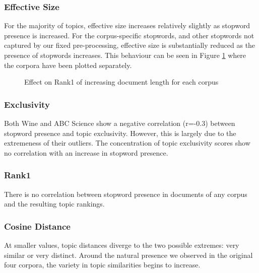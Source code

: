 \documentclass[letterpaper, 10 pt, conference]{ieeeconf}  %
\begin{document}
\subsubsection{Effective Size}
For the majority of topics, effective size increases relatively slightly as stopword presence is increased. For the corpus-specific stopwords, and other stopwords not captured by our fixed pre-processing, effective size is substantially reduced as the presence of stopwords increases. This behaviour can be seen in Figure \ref{fig:sw_eff_size_4_6} where the corpora have been plotted separately.
\begin{figure}[thpb]
      \centering
      \caption{Effect on Rank1 of increasing document length for each corpus}
      \label{fig:sw_eff_size_4_6}
   \end{figure}

\subsubsection{Exclusivity}
Both Wine and ABC Science show a negative correlation (r=-0.3) between stopword presence and topic exclusivity. However, this is largely due to the extremeness of their outliers. The concentration of topic exclusivity scores show no correlation with an increase in stopword presence.

\subsubsection{Rank1}
There is no correlation between stopword presence in documents of any corpus and the resulting topic rankings.

\subsubsection{Cosine Distance}
At smaller values, topic distances diverge to the two possible extremes: very similar or very distinct. Around the natural presence we observed in the original four corpora, the variety in topic similarities begins to increase.
\end{document}

